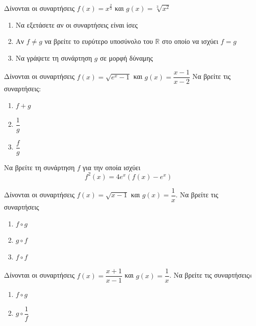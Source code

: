 \documentclass{presentation}
\begin{document}
\begin{askisi}
  Δίνονται οι συναρτήσεις $f(x)=x^{\frac{2}{3}}$ και $g(x)=\sqrt[3]{x^2}$
  \begin{enumerate}
    \item<1-> Να εξετάσετε αν οι συναρτήσεις είναι ίσες
    \item<2-> Αν $f\ne g$ να βρείτε το ευρύτερο υποσύνολο του $\mathbb{R}$ στο οποίο να ισχύει $f=g$
    \item<3-> Να γράψετε τη συνάρτηση $g$ σε μορφή δύναμης
  \end{enumerate}

\end{askisi}

\begin{askisi}
  Δίνονται οι συναρτήσεις $f(x)=\sqrt{e^x-1}$ και $g(x)=\dfrac{x-1}{x-2}$
  Να βρείτε τις συναρτήσεις:
  \begin{enumerate}
    \item<1-> $f+g$
    \item<2-> $\dfrac{1}{g}$
    \item<3-> $\dfrac{f}{g}$
  \end{enumerate}

\end{askisi}

\begin{askisi}
  Να βρείτε τη συνάρτηση $f$ για την οποία ισχύει
  $$f^2(x)=4e^x\left(f(x)-e^x\right)$$

\end{askisi}

\begin{askisi}
  Δίνονται οι συναρτήσεις $f(x)=\sqrt{x-1}$ και $g(x)=\dfrac{1}{x}$. Να βρείτε τις συναρτήσεις
  \begin{enumerate}
    \item<1-> $f\circ g$
    \item<2-> $g\circ f$
    \item<3-> $f\circ f$
  \end{enumerate}

\end{askisi}

\begin{askisi}
  Δίνονται οι συναρτήσεις $f(x)=\dfrac{x+1}{x-1}$ και $g(x)=\dfrac{1}{x}$. Να βρείτε τις συναρτήσειςs
  \begin{enumerate}
    \item<1-> $f\circ g$
    \item<2-> $g\circ \dfrac{1}{f}$
  \end{enumerate}

\end{askisi}
\end{document}

